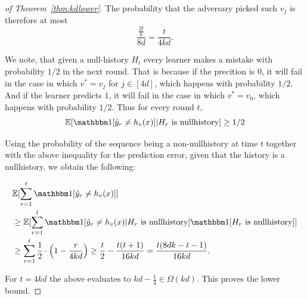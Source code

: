 \documentclass[anon]{alt2027} %
\begin{document}
\begin{proof}[of Theorem~\ref{thm:kdlower}]
The probability that the adversary picked such $v_j$ is therefore at most
\[ \frac{\frac{2t}{k}}{8d} = \frac{t}{4kd}.\]


We note, that given a null-history $H_t$ every learner makes a mistake with probability $1/2$ in the next round. That is because if the precition is $0$, it will fail in the case in which $v^*= v_j$ for $j\in [4d]$, which happens with probability $1/2$. And if the learner predicts $1$, it will fail in the case in which $v^* =v_0$, which happens with probability $1/2$.
Thus for every round $t$, 
\[\mathbb{E} [\indct[\hy_r \neq h_v(x)]|H_r \text{ is nullhistory}]  \geq 1/2\]

Using the probability of the sequence being a non-nullhistory at time $t$ together with the above inequality for the prediction error, given that the history is a nullhistory, we obtain the following:

\begin{align*}
   &\mathbb{E}[\sum_{r=1}^t  \indct[\hy_r \neq h_v(x)]]\\
   &\geq
   \mathbb{E} [\sum_{r=1}^t  \indct[\hy_r \neq h_v(x)|H_r \text{ is nullhistory}] \indct[H_r \text{ is nullhistory}]] \\
 & \geq \sum_{r=1}^t \frac{1}{2} \cdot \left(1-\frac{r}{4kd} \right)
   \geq \frac{t}{2}-\frac{t(t+1)}{16kd}  = \frac{t(8dk -t-1)}{16kd}.
\end{align*}

For $t = 4kd $ the above evaluates to $kd -\frac{1}{4} \in \Omega(kd)$. This proves the lower bound.
\end{proof}





\iffalse
\end{document}
